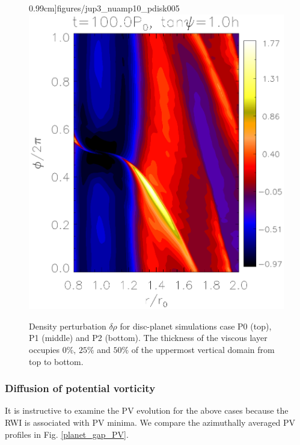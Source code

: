 \begin{figure}
     0.99cm]{figures/jup3_nuamp10_pdisk005}\includegraphics[scale=.39,clip=true,trim=2.3cm
     0.cm 0.cm
     0.99cm]{figures/jup3_nuamp10_pdisk010}\\%
   \caption{Density perturbation $\delta\rho$ for disc-planet
     simulations case P0 (top), P1 (middle) and P2 (bottom). The
     thickness of the viscous layer occupies $0\%,\,25\%$ and $50\%$
     of the uppermost vertical domain from top to bottom. 
   \label{jup0}}
 \end{figure}


\subsubsection{Diffusion of potential vorticity}
It is instructive to examine the PV evolution for the above cases 
because the RWI is associated with PV minima. We compare the 
azimuthally averaged PV profiles in Fig. \ref{planet_gap_PV}.  

